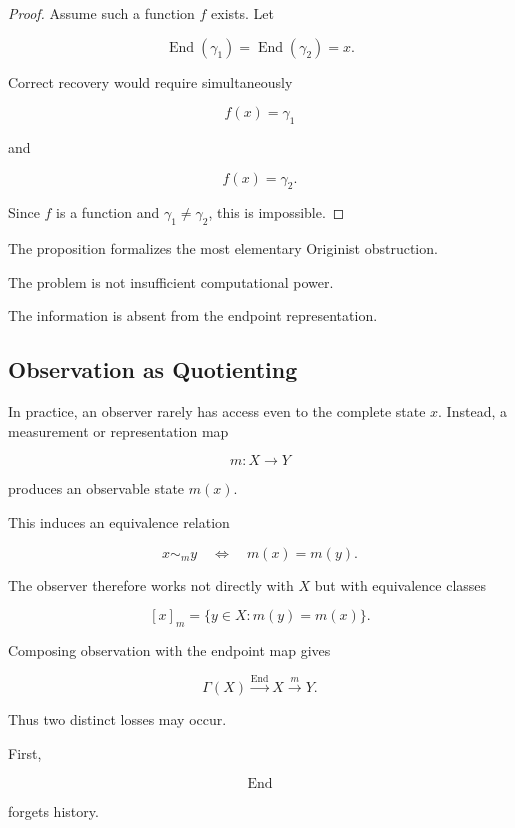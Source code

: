 \documentclass[
  11pt,
  a4paper,
  DIV=12,
  BCOR=0mm,
  parskip=half-
]{scrartcl}
\newcommand{\End}{\operatorname{End}}
\theoremstyle{definition}
\theoremstyle{plain}
\theoremstyle{remark}
\begin{document}
\begin{proof}
Assume such a function \(f\) exists. Let

\[
  \End(\gamma_1)
  =
  \End(\gamma_2)
  =
  x.
\]

Correct recovery would require simultaneously

\[
  f(x)=\gamma_1
\]

and

\[
  f(x)=\gamma_2.
\]

Since \(f\) is a function and \(\gamma_1\neq\gamma_2\), this is impossible.
\end{proof}

The proposition formalizes the most elementary Originist obstruction.

The problem is not insufficient computational power.

The information is absent from the endpoint representation.


\subsection{Observation as Quotienting}
\label{app:observational-quotients}

In practice, an observer rarely has access even to the complete state \(x\).
Instead, a measurement or representation map

\[
  m:X\to Y
\]

produces an observable state \(m(x)\).

This induces an equivalence relation

\[
  x\sim_m y
  \quad\Longleftrightarrow\quad
  m(x)=m(y).
\]

The observer therefore works not directly with \(X\) but with equivalence
classes

\[
  [x]_m
  =
  \{
    y\in X:m(y)=m(x)
  \}.
\]

Composing observation with the endpoint map gives

\[
  \Gamma(X)
  \xrightarrow{\End}
  X
  \xrightarrow{m}
  Y.
\]

Thus two distinct losses may occur.

First,

\[
  \End
\]

forgets history.
\end{document}
